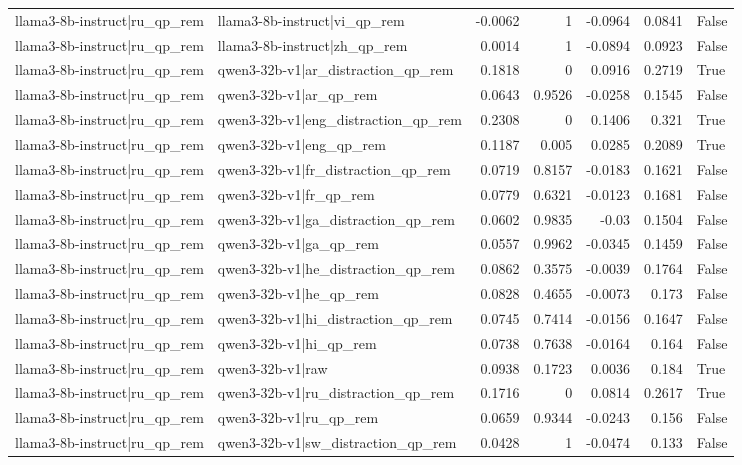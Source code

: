 \begin{table}
\begin{tabular}{l l r r r r l}
llama3-8b-instruct|ru_qp_rem & llama3-8b-instruct|vi_qp_rem & -0.0062 & 1 & -0.0964 & 0.0841 & False \\
llama3-8b-instruct|ru_qp_rem & llama3-8b-instruct|zh_qp_rem & 0.0014 & 1 & -0.0894 & 0.0923 & False \\
llama3-8b-instruct|ru_qp_rem & qwen3-32b-v1|ar_distraction_qp_rem & 0.1818 & 0 & 0.0916 & 0.2719 & True \\
llama3-8b-instruct|ru_qp_rem & qwen3-32b-v1|ar_qp_rem & 0.0643 & 0.9526 & -0.0258 & 0.1545 & False \\
llama3-8b-instruct|ru_qp_rem & qwen3-32b-v1|eng_distraction_qp_rem & 0.2308 & 0 & 0.1406 & 0.321 & True \\
llama3-8b-instruct|ru_qp_rem & qwen3-32b-v1|eng_qp_rem & 0.1187 & 0.005 & 0.0285 & 0.2089 & True \\
llama3-8b-instruct|ru_qp_rem & qwen3-32b-v1|fr_distraction_qp_rem & 0.0719 & 0.8157 & -0.0183 & 0.1621 & False \\
llama3-8b-instruct|ru_qp_rem & qwen3-32b-v1|fr_qp_rem & 0.0779 & 0.6321 & -0.0123 & 0.1681 & False \\
llama3-8b-instruct|ru_qp_rem & qwen3-32b-v1|ga_distraction_qp_rem & 0.0602 & 0.9835 & -0.03 & 0.1504 & False \\
llama3-8b-instruct|ru_qp_rem & qwen3-32b-v1|ga_qp_rem & 0.0557 & 0.9962 & -0.0345 & 0.1459 & False \\
llama3-8b-instruct|ru_qp_rem & qwen3-32b-v1|he_distraction_qp_rem & 0.0862 & 0.3575 & -0.0039 & 0.1764 & False \\
llama3-8b-instruct|ru_qp_rem & qwen3-32b-v1|he_qp_rem & 0.0828 & 0.4655 & -0.0073 & 0.173 & False \\
llama3-8b-instruct|ru_qp_rem & qwen3-32b-v1|hi_distraction_qp_rem & 0.0745 & 0.7414 & -0.0156 & 0.1647 & False \\
llama3-8b-instruct|ru_qp_rem & qwen3-32b-v1|hi_qp_rem & 0.0738 & 0.7638 & -0.0164 & 0.164 & False \\
llama3-8b-instruct|ru_qp_rem & qwen3-32b-v1|raw & 0.0938 & 0.1723 & 0.0036 & 0.184 & True \\
llama3-8b-instruct|ru_qp_rem & qwen3-32b-v1|ru_distraction_qp_rem & 0.1716 & 0 & 0.0814 & 0.2617 & True \\
llama3-8b-instruct|ru_qp_rem & qwen3-32b-v1|ru_qp_rem & 0.0659 & 0.9344 & -0.0243 & 0.156 & False \\
llama3-8b-instruct|ru_qp_rem & qwen3-32b-v1|sw_distraction_qp_rem & 0.0428 & 1 & -0.0474 & 0.133 & False \\

\end{tabular}
\end{table}
